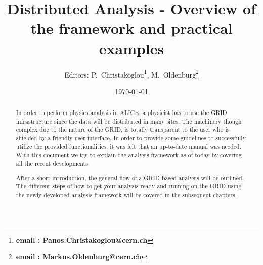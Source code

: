 \documentclass[12pt,a4paper,twoside]{article}
\begin{document}
\title{Distributed Analysis - Overview of the framework and practical examples}
\author{Editors: P.~Christakoglou\footnote{{\bf email : Panos.Christakoglou@cern.ch}}, M.~Oldenburg\footnote{{\bf email : Markus.Oldenburg@cern.ch}}}
\date{\today}

\maketitle

\begin{abstract}
In order to perform physics analysis in ALICE, a physicist has to use the GRID infrastructure since the data will be distributed in many sites. The machinery though complex due to the nature of the GRID, is totally transparent to the user who is shielded by a friendly user interface. In order to provide some guidelines to successfully utilize the provided functionalities, it was felt that an up-to-date manual was needed. With this document we try to explain the analysis framework as of today by covering all the recent developments.

After a short introduction, the general flow of a GRID based analysis will be outlined. The different steps of how to get your analysis ready and running on the GRID using the newly developed analysis framework will be covered in the subsequent chapters.


\end{abstract}

\newpage
\tableofcontents









\begin{appendix}


\end{appendix}
\end{document}
